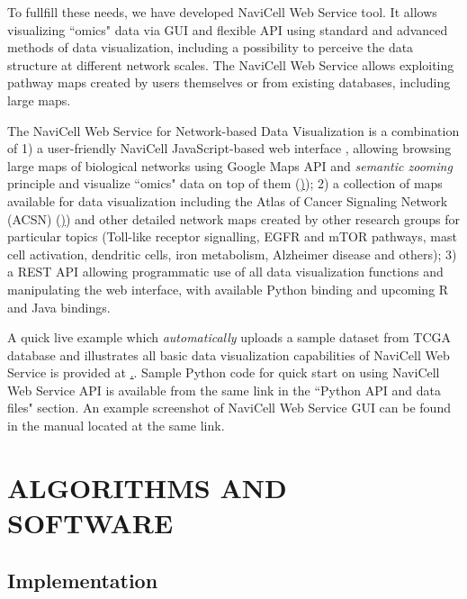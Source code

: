 \documentclass[a4,center,fleqn]{NAR}
\begin{document}
To fullfill these needs, we have developed NaviCell Web Service tool. It allows
visualizing ``omics" data via GUI and flexible API using standard and advanced
methods of data visualization, including a possibility to perceive the data
structure at different network scales. The NaviCell Web Service allows
exploiting pathway maps created by users themselves or from existing databases,
including large maps.


\enlargethispage{-65.1pt}

The NaviCell Web Service for Network-based Data
Visualization is a combination of 1) a user-friendly NaviCell JavaScript-based
web interface \cite{kuperstein2013navicell}, allowing browsing large maps
of biological networks using Google Maps API and \emph{semantic zooming}
principle and visualize ``omics" data on top of them
(\href{https://navicell.curie.fr})); 2) a collection of maps available for
data visualization including the Atlas of Cancer Signaling Network (ACSN)
(\href{https://acsn.curie.fr}))  and other detailed network maps created by other 
research groups for particular topics (Toll-like receptor signalling, EGFR
and mTOR pathways, mast cell activation, dendritic cells, iron metabolism,
Alzheimer disease and others); 3) a REST API allowing programmatic use of all
data visualization functions and manipulating the web interface, with available
Python binding and upcoming R and Java bindings.

A quick live example which \emph{automatically} uploads a sample dataset from
TCGA database and illustrates all basic data visualization capabilities of
NaviCell Web Service is provided at
\href{http://navicell.curie.fr/pages/nav\_web\_service.html}.. Sample Python
code for quick start on using NaviCell Web Service API is available from the
same link in the ``Python API and data files" section. An example screenshot of NaviCell
Web Service GUI can be found in the manual located at the same link.

\section{ALGORITHMS AND SOFTWARE}

\subsection{Implementation}
\end{document}
